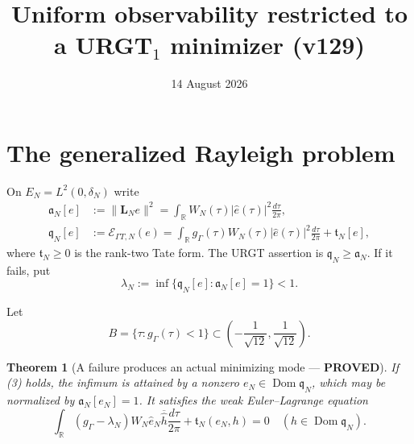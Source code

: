\documentclass[11pt]{article}
\title{Uniform observability restricted to a URGT$_1$ minimizer (v129)}
\date{14 August 2026}
\newcommand{\PROVED}{\textcolor{green!40!black}{\textbf{PROVED}}}
\newtheorem{theorem}{Theorem}
\begin{document}
\maketitle

\section{The generalized Rayleigh problem}

On $E_N=L^2(0,\delta_N)$ write
\begin{align}
 \mathfrak a_N[e]
 &:=\|\mathbf L_Ne\|^2
 =\int_{\mathbb R}W_N(\tau)|\widehat e(\tau)|^2
                    \frac{d\tau}{2\pi},                   \tag{1}\\
 \mathfrak q_N[e]
 &:=\mathcal E_{\Gamma T,N}(e)
 =\int_{\mathbb R}g_\Gamma(\tau)W_N(\tau)|\widehat e(\tau)|^2
                    \frac{d\tau}{2\pi}+\mathfrak t_N[e], \tag{2}
\end{align}
where $\mathfrak t_N\ge0$ is the rank-two Tate form.  The URGT assertion
is $\mathfrak q_N\ge\mathfrak a_N$.  If it fails, put
\begin{equation}
 \lambda_N:=\inf\{\mathfrak q_N[e]:\mathfrak a_N[e]=1\}<1. \tag{3}
\end{equation}

Let
\begin{equation}
 B=\{\tau:g_\Gamma(\tau)<1\}
 \subset\left(-\frac1{\sqrt{12}},\frac1{\sqrt{12}}\right).
                                                                    \tag{4}
\end{equation}

\begin{theorem}[A failure produces an actual minimizing mode --- \PROVED]
If (3) holds, the infimum is attained by a nonzero
$e_N\in\operatorname{Dom}\mathfrak q_N$, which may be normalized by
$\mathfrak a_N[e_N]=1$.  It satisfies the weak Euler--Lagrange equation
\begin{equation}
 \boxed{
 \int_{\mathbb R}(g_\Gamma-\lambda_N)W_N
       \widehat e_N\overline{\widehat h}\frac{d\tau}{2\pi}
 +\mathfrak t_N(e_N,h)=0
 \quad(h\in\operatorname{Dom}\mathfrak q_N).}             \tag{5}
\end{equation}
\end{theorem}
\end{document}
